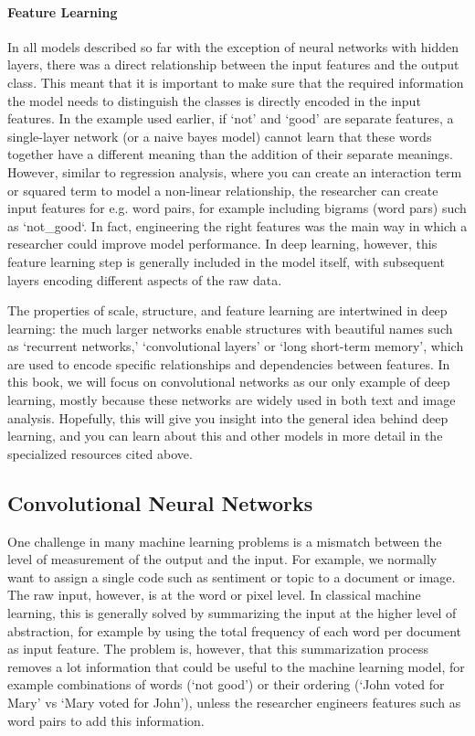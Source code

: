 \paragraph{Feature Learning}
In all models described so far with the exception of neural networks with hidden layers,
there was a direct relationship between the input features and the output class.
This meant that it is important to make sure that the required information the model needs to distinguish the classes
is directly encoded in the input features.
In the example used earlier, if `not' and `good' are separate features, a single-layer network (or a naive bayes model)
cannot learn that these words together have a different meaning than the addition of their separate meanings.
However, similar to regression analysis, where you can create an interaction term or squared term to model a non-linear relationship,
the researcher can create input features for e.g. word pairs, for example including bigrams (word pars) such as `not\_good`.
In fact, engineering the right features was the main way in which a researcher could improve model performance.
In deep learning, however, this feature learning step is generally included in the model itself,
with subsequent layers encoding different aspects of the raw data.

The properties of scale, structure, and feature learning are intertwined in deep learning: the much larger networks enable structures with beautiful names such as `recurrent networks,' `convolutional layers' or `long short-term memory',
which are used to encode specific relationships and dependencies between features.
In this book, we will focus on convolutional networks as our only example of deep learning,
mostly because these networks are widely used in both text and image analysis.
Hopefully, this will give you insight into the general idea behind deep learning,
and you can learn about this and other models in more detail in the specialized resources cited above.  

\subsection{Convolutional Neural Networks}
\label{sec:cnnbasis}

One challenge in many machine learning problems is a mismatch between the level of measurement of the output and the input.
For example, we normally want to  assign a single code such as sentiment or topic to a document or image.
The raw input, however, is at the word or pixel level.
In classical machine learning, this is generally solved by summarizing the input at the higher level of abstraction,
for example by using the total frequency of each word per document as input feature.
The problem is, however, that this summarization process removes a lot information that could be useful to the machine learning model,
for example combinations of words (`not good') or their ordering (`John voted for Mary' vs `Mary voted for John'),
unless the researcher engineers features such as word pairs to add this information.

